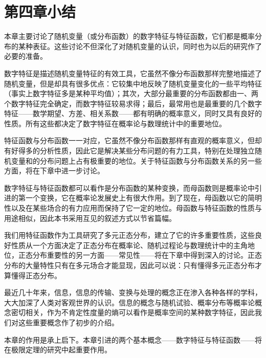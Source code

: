 \documentclass[../../main.tex]{subfiles}
\begin{document}
\section*{第四章小结}\label{section:ch04-小结}

本章主要讨论了随机变量（或分布函数）的数字特征与特征函数，它们都是概率分布的某种表征。这些讨论不但深化了对随机变量的认识，同时也为以后的研究作了必要的准备。

数字特征是描述随机变量特征的有效工具，它虽然不像分布函数那样完整地描述了随机变量，但是却具有很多优点：它较集中地反映了随机变量变化的一些平均特征（事实上数字特征多是某种平均值）；其次，大部分最重要的分布函数都由一、两个数字特征完全确定，而数字特征较易求得；最后，最常用也是最重要的几个数字特征——数学期望、方差、相关系数——都有明确的概率意义，同时又具有良好的性质。所有这些都决定了数字特征在概率论与数理统计中的重要地位。

特征函数与分布函数一一对应，它虽然不像分布函数那样有直观的概率意义，但却有好得多的分析性质，因此它是解决某些分布问题的有力工具，特别在处理独立随机变量和的分布问题上占有极重要的地位。关于特征函数与分布函数关系的另一些方面，将在下章中进一步讨论。

数字特征与特征函数都可以看作是分布函数的某种变换，而母函数则是概率论中引进的第一个变换，它在概率论发展史上有很大作用。到了现在，母函数以它的简明性以及在某些场合的有力应用而保持了它一定的地位。母函数与特征函数的性质与用途相似，因此本书采用互见的叙述方式以节省篇幅。

我们用特征函数作为工具研究了多元正态分布，建立了它的许多重要性质，这些良好性质从一个方面决定了正态分布在概率论、随机过程论与数理统计中的主角地位，正态分布重要性的另一方面——常见性——将在下章中得到深入的讨论。正态分布的大量特性只有在多元场合才能显现，因此可以说：只有懂得多元正态分布才算懂得正态分布。

最近几十年来，信息，信息的传输、变换与处理的概念正在渗入各种各样的学科，大大加深了人类对客观世界的认识。信息的概念与随机试验、概率分布等概率论概念密切相关，作为不肯定性度量的熵可以看作是概率空间的某种数字特征，因此我们对这些重要概念作了初步的介绍。

本章的作用是承上启下。本章引进的两个基本概念——数字特征与特征函数——将在极限定理的研究中起重要作用。
\end{document}
